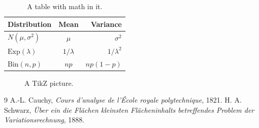 \documentclass[11pt,letterpaper]{article}
\theoremstyle{definition}
\theoremstyle{remark}
\begin{document}
\begin{table}[h]
    \centering
    \caption{A table with math in it.}
    \label{tab:booktabs}
    \begin{tabular}{lcr}
        \toprule
        Distribution & Mean & Variance \\
        \midrule
        $N(\mu, \sigma^2)$ & $\mu$ & $\sigma^2$ \\
        $\mathrm{Exp}(\lambda)$ & $1/\lambda$ & $1/\lambda^2$ \\
        $\mathrm{Bin}(n, p)$ & $np$ & $np(1 - p)$ \\
        \bottomrule
    \end{tabular}
\end{table}
\begin{figure}[h]
    \centering
    \caption{A TikZ picture.}
    \label{fig:tikz}
\end{figure}

\begin{thebibliography}{9}
     A.-L. Cauchy, \emph{Cours d'analyse de l'\'Ecole royale polytechnique}, 1821.
     H. A. Schwarz, \emph{\"Uber ein die Fl\"achen kleinsten Fl\"acheninhalts betreffendes Problem der Variationsrechnung}, 1888.
\end{thebibliography}
\end{document}
